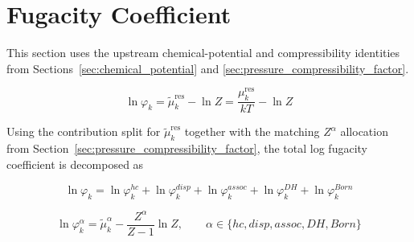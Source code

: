\documentclass[12pt, letterpaper]{article}
\begin{document}
\section{Fugacity Coefficient}
\label{sec:fugacity_coefficient}

This section uses the upstream chemical-potential and compressibility identities from Sections~\ref{sec:chemical_potential} and \ref{sec:pressure_compressibility_factor}.

\begin{equation}
    \ln\varphi_{k}
    =
    \tilde{\mu}_{k}^{\mathrm{res}}
    -
    \ln Z
    =
    \frac{\mu_{k}^{\mathrm{res}}}{kT}
    -
    \ln Z
    \label{eq:lnphi_total}
\end{equation}

Using the contribution split for \(\tilde{\mu}_{k}^{\mathrm{res}}\) together with the matching \(Z^\alpha\) allocation from Section~\ref{sec:pressure_compressibility_factor}, the total log fugacity coefficient is decomposed as


\begin{equation}
    \ln\varphi_{k}
    =
    \ln\varphi_{k}^{hc}
    +
    \ln\varphi_{k}^{disp}
    +
    \ln\varphi_{k}^{assoc}
    +
    \ln\varphi_{k}^{DH}
    +
    \ln\varphi_{k}^{Born}
    \label{eq:lnphi_total_sum}
\end{equation}


\begin{equation}
    \ln\varphi_{k}^{\alpha}
    =
    \tilde{\mu}_{k}^{\alpha}
    -
    \frac{Z^{\alpha}}{Z-1}\ln Z,
    \qquad
    \alpha\in\{hc,disp,assoc,DH,Born\}
    \label{eq:lnphi_alpha}
\end{equation}
\end{document}
